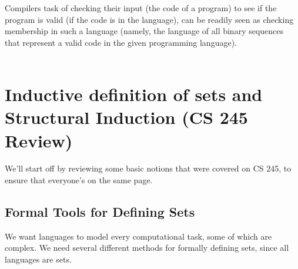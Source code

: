 \documentclass[]{article}
\theoremstyle{definition}
\begin{document}
        Compilers task of checking their input (the code of a program) to see if the program is valid (if the code is in the language), can be readily seen as checking membership in such a language (namely, the language of all binary sequences that represent a valid code in the given programming language).
        \\ \\

  \section{Inductive definition of sets and Structural Induction (CS 245 Review)}
    We'll start off by reviewing some basic notions that were covered on CS 245, to ensure that everyone's on the same page.
      \subsection{Formal Tools for Defining Sets}
        We want languages to model every computational task, some of which are complex. We need several different methods for formally defining sets, since all languages are sets.
\end{document}

